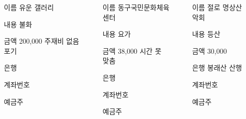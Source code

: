 \documentclass[	25pt, 
							a0paper, 
							portrait, %
							margin=0mm, %
							innermargin=10mm,  		%
							blockverticalspace=4mm, %
							colspace=5mm, 
							subcolspace=0mm
							]{tikzposter}
\begin{document}
\begin{columns}
		{
			\setlength{\leftmargini}{7em}			
			\setlength{\labelsep}{1em} %
			\begin{LARGE}
			\begin{itemize}
			\item [이름] 유운 갤러리
			\item [내용] 불화
			\item [금액] 200,000 주재비 없음 포기
			\item [은행] 
			\item [계좌번호] 
			\item [예금주] 
			\end{itemize}
			\end{LARGE}
		}		


		{
			\setlength{\leftmargini}{7em}			
			\setlength{\labelsep}{1em} %
			\begin{LARGE}
			\begin{itemize}
			\item [이름] 동구국민문화체육센터
			\item [내용] 요가
			\item [금액] 38,000 시간 못 맞춤
			\item [은행] 
			\item [계좌번호] 
			\item [예금주] 
			\end{itemize}
			\end{LARGE}
		}		

		{
			\setlength{\leftmargini}{7em}			
			\setlength{\labelsep}{1em} %
			\begin{LARGE}
			\begin{itemize}
			\item [이름] 절로 명상산악회
			\item [내용] 등산
			\item [금액] 30,000 
			\item [은행] 봉래산 산행 
			\item [계좌번호] 
			\item [예금주] 
			\end{itemize}
			\end{LARGE}
		}		




	\end{columns}
\end{document}

